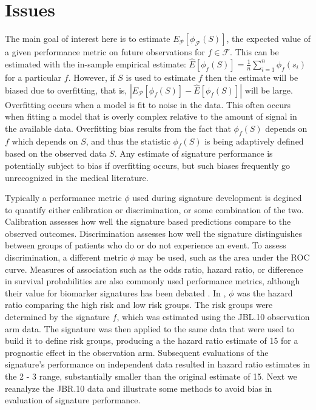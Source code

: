 \documentclass[11pt,]{article}
\begin{document}
\section{Issues}\label{issues}

The main goal of interest here is to estimate
\(E_\mathcal{P}[\phi_\mathcal{F}(S)]\), the expected value of a given
performance metric on future observations for \(f \in \mathcal{F}\).
This can be estimated with the in-sample empirical estimate:
\(\hat{E}[\phi_f(S)] = \frac{1}{n}\sum_{i=1}^n\phi_f(s_i)\) for a
particular \(f\). However, if \(S\) is used to estimate \(f\) then the
estimate will be biased due to overfitting, that is,
\(|E_\mathcal{P}[\phi_f(S)] - \hat{E}[\phi_f(S)]|\) will be large.
Overfitting occurs when a model is fit to noise in the data. This often
occurs when fitting a model that is overly complex relative to the
amount of signal in the available data. Overfitting bias results from
the fact that \(\phi_f(S)\) depends on \(f\) which depends on \(S\), and
thus the statistic \(\phi_f(S)\) is being adaptively defined based on
the observed data \(S\). Any estimate of signature performance is
potentially subject to bias if overfitting occurs, but such biases
frequently go unrecognized in the medical literature.

Typically a performance metric \(\phi\) used during signature
development is degined to quantify either calibration or discrimination,
or some combination of the two. Calibration assesses how well the
signature based predictions compare to the observed outcomes.
Discrimination assesses how well the signature distinguishes between
groups of patients who do or do not experience an event. To assess
discrimination, a different metric \(\phi\) may be used, such as the
area under the ROC curve. Measures of association such as the odds
ratio, hazard ratio, or difference in survival probabilities are also
commonly used performance metrics, although their value for biomarker
signatures has been debated \citep{pepe2004limitations}. In
\citet{zhu2010prognostic}, \(\phi\) was the hazard ratio comparing the
high risk and low risk groups. The risk groups were determined by the
signature \(f\), which was estimated using the JBL.10 observation arm
data. The signature was then applied to the same data that were used to
build it to define risk groups, producing a the hazard ratio estimate of
15 for a prognostic effect in the observation arm. Subsequent
evaluations of the signature's performance on independent data resulted
in hazard ratio estimates in the 2 - 3 range, substantially smaller than
the original estimate of 15. Next we reanalyze the JBR.10 data and
illustrate some methods to avoid bias in evaluation of signature
performance.
\end{document}
